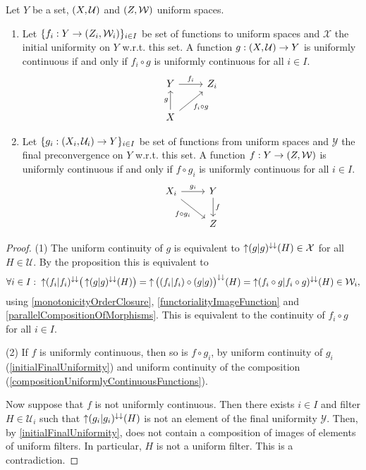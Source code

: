 \begin{proposition} \label{characteristicPropertyInitialFinalUniformity}
Let $Y$ be a set, $\sSet{X,\mathcal{U}}$ and $\sSet{Z, \mathcal{W}}$ uniform spaces.
\begin{enumerate}
\item Let $\{f_i: Y\to \sSet{Z_i, \mathcal{W}_i}\}_{i\in I}$ be set of functions to uniform spaces and $\mathcal{X}$ the initial uniformity on $Y$ w.r.t. this set. A function $g: \sSet{X, \mathcal{U}}\to Y$ is uniformly continuous \textup{if and only if} $f_i \circ g$ is uniformly continuous for all $i\in I$.
\[ \begin{tikzcd}
Y \ar[r, "f_i"] & Z_i \\ X \ar[u, "g"] \ar[ur, swap, "f_i\circ g"]
\end{tikzcd} \]
\item Let $\{g_i: \sSet{X_i, \mathcal{U}_i} \to Y\}_{i\in I}$ be set of functions from uniform spaces and $\mathcal{Y}$ the final preconvergence on $Y$ w.r.t. this set. A function $f: Y\to \sSet{Z,\mathcal{W}}$ is uniformly continuous \textup{if and only if} $f\circ g_i$ is uniformly continuous for all $i\in I$.
\[ \begin{tikzcd}
X_i \ar[r, "g_i"] \ar[dr, swap, "f\circ g_i"] & Y \ar[d, "f"] \\ & Z
\end{tikzcd} \]
\end{enumerate}
\end{proposition}
\begin{proof}
(1) The uniform continuity of $g$ is equivalent to $\operatorname{\uparrow}(g|g)^{\downarrow\downarrow}(H)\in \mathcal{X}$ for all $H\in \mathcal{U}$. By the proposition this is equivalent to
\[ \forall i \in I: \; \operatorname{\uparrow}(f_i|f_i)^{\downarrow\downarrow}\big(\operatorname{\uparrow}(g|g)^{\downarrow\downarrow}(H)\big) = \operatorname{\uparrow}\big((f_i|f_i)\circ (g|g)\big)^{\downarrow\downarrow}(H) = \operatorname{\uparrow}(f_i\circ g|f_i\circ g)^{\downarrow\downarrow}(H) \in \mathcal{W}_i,  \]
using \ref{monotonicityOrderClosure}, \ref{functorialityImageFunction} and \ref{parallelCompositionOfMorphisms}.
This is equivalent to the continuity of $f_i\circ g$ for all $i\in I$.

(2) If $f$ is uniformly continuous, then so is $f\circ g_i$, by uniform continuity of $g_i$ (\ref{initialFinalUniformity}) and uniform continuity of the composition (\ref{compositionUniformlyContinuousFunctions}).

Now suppose that $f$ is not uniformly continuous. Then there exists $i\in I$ and filter $H\in \mathcal{U}_i$ such that $\operatorname{\uparrow} (g_i|g_i)^{\downarrow\downarrow}(H)$ is not an element of the final uniformity $\mathcal{Y}$. Then, by \ref{initialFinalUniformity}, does not contain a composition of images of elements of uniform filters. In particular, $H$ is not a uniform filter. This is a contradiction.
\end{proof}

